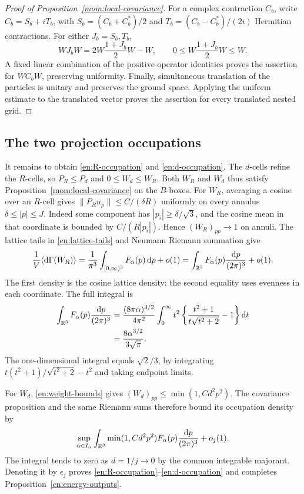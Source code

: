 \begin{proof}[Proof of Proposition~\ref{mom:local-covariance}]
For a complex contraction $C_b$, write
$C_b=S_b+iT_b$, with $S_b=(C_b+C_b^*)/2$ and
$T_b=(C_b-C_b^*)/(2i)$ Hermitian contractions.  For either $J_b=S_b,T_b$,
\[
 WJ_bW=2W\frac{1+J_b}{2}W-W,
 \qquad 0\le W\frac{1+J_b}{2}W\le W.
\]
A fixed linear combination of the positive-operator identities proves
the assertion for $WC_bW$, preserving uniformity.  Finally, simultaneous
translation of the particles is unitary and preserves the ground space.
Applying the uniform estimate to the translated vector proves the
assertion for every translated nested grid.
\end{proof}

\subsection{The two projection occupations}

It remains to obtain \eqref{en:R-occupation} and
\eqref{en:d-occupation}.  The $d$-cells refine the $R$-cells, so
$P_R\le P_d$ and $0\le W_d\le W_R$.  Both $W_R$ and $W_d$ thus
satisfy Proposition~\ref{mom:local-covariance} on the $B$-boxes.
For $W_R$, averaging a cosine over an $R$-cell gives
$\|P_Ru_p\|\le C/(\delta R)$ uniformly on every annulus
$\delta\le|p|\le J$.  Indeed some component has
$|p_i|\ge\delta/\sqrt3$, and the cosine mean in that coordinate is
bounded by $C/(R|p_i|)$.  Hence $(W_R)_{pp}\to1$ on annuli.
The lattice tails in \eqref{en:lattice-tails} and Neumann Riemann
summation give
\[
 \frac1V\langle\mathrm d\Gamma(W_R)\rangle
   =\frac1{\pi^3}\int_{[0,\infty)^3}F_\alpha(p)\,\mathrm d p+o(1)
   =\int_{\mathbb R^3}F_\alpha(p)\frac{\mathrm d p}{(2\pi)^3}+o(1).
\]
The first density is the cosine lattice density; the second equality
uses evenness in each coordinate.  The full integral is
\begin{align}
 \int_{\mathbb R^3}F_\alpha(p)\frac{\mathrm d p}{(2\pi)^3}
 &=\frac{(8\pi\alpha)^{3/2}}{4\pi^2}
       \int_0^\infty t^2
       \left\{\frac{t^2+1}{t\sqrt{t^2+2}}-1\right\}\mathrm d t\nonumber\\
 &=\frac{8\alpha^{3/2}}{3\sqrt\pi}.
 \label{en:integral}
\end{align}
The one-dimensional integral equals $\sqrt2/3$, by integrating
$t(t^2+1)/\sqrt{t^2+2}-t^2$ and taking endpoint limits.

For $W_d$, \eqref{en:weight-bounds} gives
$(W_d)_{pp}\le\min(1,Cd^2p^2)$.  The covariance proposition and the
same Riemann sums therefore bound its occupation density by
\[
 \sup_{\alpha\in I_\alpha}\int_{\mathbb R^3}
       \min(1,Cd^2p^2)F_\alpha(p)\frac{\mathrm d p}{(2\pi)^3}+o_j(1).
\]
The integral tends to zero as $d=1/j\to0$ by the common integrable
majorant.  Denoting it by $\epsilon_j$ proves
\eqref{en:R-occupation}--\eqref{en:d-occupation} and completes
Proposition~\ref{en:energy-outputs}.
